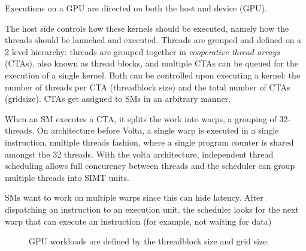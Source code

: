 Executions on a GPU are directed on both the host and device (GPU).

The host side controls how these kernels should be executed, namely how the threads should be launched and executed.
Threads are grouped and defined on a 2 level hierarchy: threads are grouped together in \textit{cooperative thread arrays} (CTAs), also known as thread blocks, and multiple CTAs can be queued for the execution of a single kernel.
Both can be controlled upon executing a kernel: the number of threads per CTA (threadblock size) and the total number of CTAs (gridsize).
CTAs get assigned to SMs in an arbitrary manner.

When an SM executes a CTA, it splits the work into warps, a grouping of 32-threads.
On architecture before Volta, a single warp is executed in a single instruction, multiple threads fashion, where a single program counter is shared amongst the 32 threads.
With the volta architecture, independent thread scheduling allows full concurency between threads and the scheduler can group multiple threads into SIMT units.

SMs want to work on multiple warps since this can hide latency.
After dispatching an instruction to an execution unit, the scheduler looks for the next warp that can execute an instruction (for example, not waiting for data) 

\begin{figure}[!hb]
    \centering
    \caption{
        GPU workloads are defined by the threadblock size and grid size.
    }
\end{figure}


